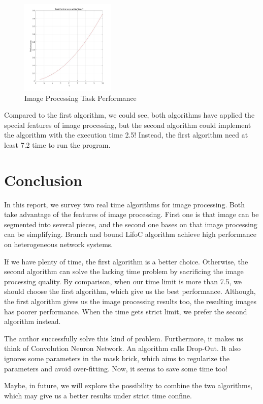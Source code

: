 \documentclass[twocolumn]{article}
\begin{document}
\begin{figure}[H]
\centering
  \includegraphics[width=0.4\textwidth]{perf.jpg}
\caption{Image Processing Task Performance}
\end{figure}

Compared to the first algorithm, we could see, both algorithms have applied the special features of image processing, but the second algorithm could implement the algorithm with the execution time 2.5! Instead, the first algorithm need at least 7.2 time to run the program.

\section{Conclusion} 
In this report, we survey two real time algorithms for image processing. Both take advantage of the features of image processing. First one is that image can be segmented into several pieces, and the second one bases on that image processing can be simplifying. Branch and bound LifoC algorithm achieve high performance on heterogeneous network systems. 

If we have plenty of time, the first algorithm is a better choice. Otherwise, the second algorithm can solve the lacking time problem by sacrificing the image processing quality. By comparison, when our time limit is more than 7.5, we should choose the first algorithm, which give us the best performance. Although, the first algorithm gives us the image processing results too, the resulting images has poorer performance. When the time gets strict limit, we prefer the second algorithm instead.

The author successfully solve this kind of problem. Furthermore, it makes us think of Convolution Neuron Network. An algorithm calls Drop-Out. It also ignores some parameters in the mask brick, which aims to regularize the parameters and avoid over-fitting. Now, it seems to save some time too!

Maybe, in future, we will explore the possibility to combine the two algorithms, which may give us a better results under strict time confine.
\end{document}
